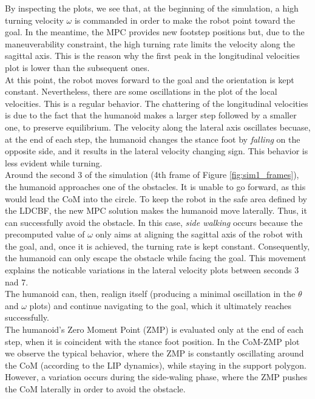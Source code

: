 By inspecting the plots, we see that, at the beginning of the simulation, a high turning velocity $\omega$ is commanded in order to make the robot point toward the goal. In the meantime, the MPC provides new footstep positions but, due to the maneuverability constraint, the high turning rate limits the velocity along the sagittal axis. This is the reason why the first peak in the longitudinal velocities plot is lower than the subsequent ones.\\
At this point, the robot moves forward to the goal and the orientation is kept constant. Nevertheless, there are some oscillations in the plot of the local velocities. This is a regular behavior. The chattering of the longitudinal velocities is due to the fact that the humanoid makes a larger step followed by a smaller one, to preserve equilibrium. The velocity along the lateral axis oscillates becuase, at the end of each step, the humanoid changes the stance foot by \textit{falling} on the opposite side, and it results in the lateral velocity changing sign. This behavior is less evident while turning.\\
Around the second 3 of the simulation (4th frame of Figure \ref{fig:sim1_frames}), the humanoid approaches one of the obstacles. It is unable to go forward, as this would lead the CoM into the circle. To keep the robot in the safe area defined by the LDCBF, the new MPC solution makes the humanoid move laterally. Thus, it can successfully avoid the obstacle. In this case, \textit{side walking} occurs because the precomputed value of $\omega$ only aims at aligning the sagittal axis of the robot with the goal, and, once it is achieved, the turning rate is kept constant. Consequently, the humanoid can only escape the obstacle while facing the goal. This movement explains the noticable variations in the lateral velocity plots between seconds 3 nad 7.\\
The humanoid can, then, realign itself (producing a minimal oscillation in the $\theta$ and $\omega$ plots) and continue navigating to the goal, which it ultimately reaches successfully.\\
The humanoid's Zero Moment Point (ZMP) is evaluated only at the end of each step, when it is coincident with the stance foot position. In the CoM-ZMP plot we observe the typical behavior, where the ZMP is constantly oscillating around the CoM (according to the LIP dynamics), while staying in the support polygon. However, a variation occurs during the side-waling phase, where the ZMP pushes the CoM laterally in order to avoid the obstacle.

